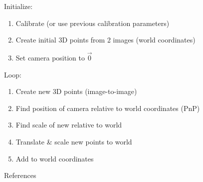 \documentclass{beamer}
\begin{document}
\begin{frame}
	Initialize:
	\begin{enumerate}
		\item Calibrate (or use previous calibration parameters)
		\item Create initial 3D points from 2 images (world coordinates)
		\item Set camera position to $\vec{0}$
			\setcounter{enumTemp}{\theenumi}
	\end{enumerate}
	Loop:
	\begin{enumerate}
			 \setcounter{enumi}{\theenumTemp}
		\item Create new 3D points (image-to-image)
		\item Find position of camera relative to world coordinates (PnP)
		\item Find scale of new relative to world
		\item Translate \& scale new points to world
		\item Add to world coordinates
	\end{enumerate}
\end{frame}




\begin{frame}{References}
	
	
\end{frame}
\end{document}
